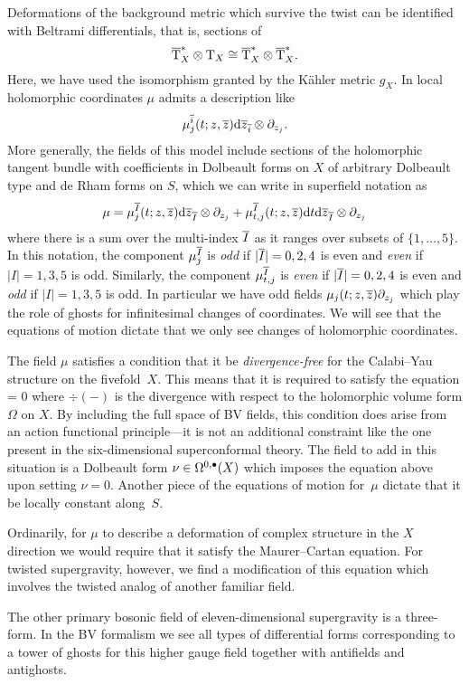 Deformations of the background metric which survive the twist can be identified with Beltrami differentials, that is, sections of 
\[
\Bar{\T}_X^* \otimes \T_X \cong \Bar{\T}^*_X \otimes \Bar{\T}_X^* . 
\]
Here, we have used the isomorphism granted by the K\"ahler metric $g_{X}$.
In local holomorphic coordinates $\mu$ admits a description like
\[
\mu^{\Bar{i}}_j (t;z,\zbar) \d \zbar_{\Bar{i}} \otimes \del_{z_j} .
\]
More generally, the fields of this model include sections of the holomorphic tangent bundle with coefficients in Dolbeault forms on $X$ of arbitrary Dolbeault type and de Rham forms on $S$, which we can write in superfield notation as 
\[
\mu = \mu^{\Bar{I}}_j (t;z,\zbar) \d \zbar_{\Bar{I}} \otimes \del_{z_j} + \mu^{\Bar{I}}_{t,j} (t;z,\zbar) \d t \d \zbar_{\Bar{I}} \otimes \del_{z_j}
\]
where there is a sum over the multi-index $\Bar{I}$ as it ranges over subsets of $\{1,\ldots,5\}$.
In this notation, the component $\mu^{\Bar{I}}_j$ is {\em odd} if $|\Bar{I}|=0,2,4$ is even and {\em even} if $|I| = 1,3,5$ is odd.
Similarly, the component $\mu^{\Bar{I}}_{t,j}$ is {\em even} if $|\Bar{I}|=0,2,4$ is even and {\em odd} if $|I| = 1,3,5$ is odd.
In particular we have odd fields $\mu_j(t;z,\zbar) \del_{z_j}$ which play the role of ghosts for infinitesimal changes of coordinates.
We will see that the equations of motion dictate that we only see changes of holomorphic coordinates.

The field $\mu$ satisfies a condition that it be {\em divergence-free} for the Calabi--Yau structure on the fivefold~$X$.
This means that it is required to satisfy the equation
\beqn
\div \mu = 0
\eeqn
where $\div(-)$ is the divergence with respect to the holomorphic volume form $\Omega$ on $X$.
By including the full space of BV fields, this condition does arise from an action functional principle---it is not an additional constraint like the one present in the six-dimensional superconformal theory.
The field to add in this situation is a Dolbeault form $\nu \in \Omega^{0,\bu}(X)$ which imposes the equation above upon setting $\nu = 0$.
Another piece of the equations of motion for~$\mu$ dictate that it be locally constant along~$S$. 

Ordinarily, for $\mu$ to describe a deformation of complex structure in the $X$ direction we would require that it satisfy the Maurer--Cartan equation.
For twisted supergravity, however, we find a modification of this equation which involves the twisted analog of another familiar field.

The other primary bosonic field of eleven-dimensional supergravity is a three-form.
In the BV formalism we see all types of differential forms corresponding to a tower of ghosts for this higher gauge field together with antifields and antighosts.
 
